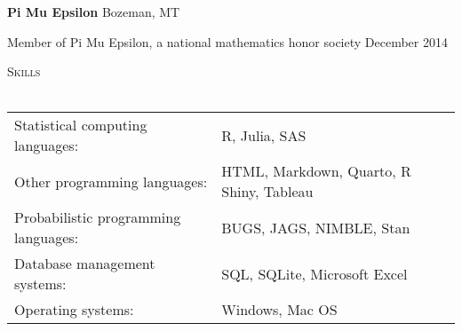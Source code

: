 \documentclass[a4paper]{article}
\newcommand{\lineunder} {
	\vspace*{-8pt} \\
	\hspace*{-18pt} \hrulefill \\
}
\newcommand{\header} [1] {
	{\hspace*{-18pt}\vspace*{6pt} \textsc{#1}}
	\vspace*{-6pt} \lineunder
}
\begin{document}
\textbf{Pi Mu Epsilon} \hfill Bozeman, MT

Member of Pi Mu Epsilon, a national mathematics honor society
\hfill December 2014

\vspace*{2mm}

\header{Skills}
\vspace*{2mm}
\begin{tabular}{ l l }
  Statistical computing languages:  & R, Julia, SAS \\
    Other programming languages:         &  HTML, Markdown, Quarto, R Shiny, Tableau \\
  Probabilistic programming languages:         & BUGS, JAGS, NIMBLE, Stan \\
    Database management systems:         & SQL, SQLite, Microsoft Excel \\
    Operating systems:       & Windows, Mac OS \\
\end{tabular}
\vspace*{2mm}
\end{document}
